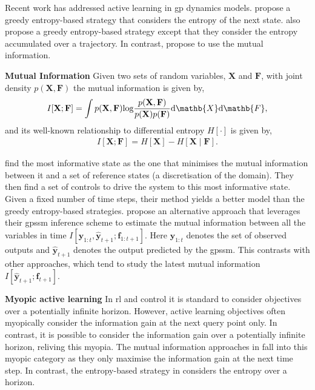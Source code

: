 \documentclass{mimosis-class/mimosis}
\numberwithin{equation}{chapter}
\begin{document}
Recent work has addressed active learning in \acrshort{gp} dynamics models. \cite{schreiterSafe2015}
propose a greedy entropy-based strategy that considers the entropy of the
next state. \cite{buisson-fenetActively2020} also propose a greedy entropy-based strategy
except that they consider the entropy accumulated over a trajectory. In contrast,
\cite{caponeLocalized2020,yuActive2021} propose to use the mutual information.
\begin{myquote}
\textbf{Mutual Information}
Given two sets of random variables, $\mathbf{X}$ and $\mathbf{F}$, with joint density $p(\mathbf{X}, \mathbf{F})$ the
mutual information \citep{coverElements2006} is given by,
\begin{align} \label{eq-mutual-information}
I[\mathbf{X};\mathbf{F}] = \int p(\mathbf{X},\mathbf{F}) \text{log}\frac{p(\mathbf{X},\mathbf{F})}{p(\mathbf{X})p(\mathbf{F})}
\text{d}\mathb{X} \text{d}\mathb{F},
\end{align}
and its well-known relationship to differential entropy $H[\cdot]$ is given by,
\begin{align} \label{eq-mutual-information-entropy}
I[\mathbf{X};\mathbf{F}] =  H[\mathbf{X}] - H[\mathbf{X} \mid \mathbf{F}].
\end{align}
\end{myquote}
\cite{caponeLocalized2020} find the most informative state as the one that minimises the
mutual information between it and a set of reference states (a discretisation of the
domain). They then find a set of controls to drive the system to this most informative state.
Given a fixed number of time steps, their method yields a better model
than the greedy entropy-based strategies.
\cite{yuActive2021}  propose an alternative
approach that leverages their \acrfull{gpssm} inference scheme to estimate the mutual
information between all the variables in time
\(I \left[\mathbf{y}_{1:t}, \hat{\mathbf{y}}_{t+1} ; \mathbf{f}_{1:t+1} \right]\).
Here \(\mathbf{y}_{1:t}\) denotes the set of observed outputs and \(\hat{\mathbf{y}}_{t+1}\) denotes
the output predicted by the \acrshort{gpssm}. This contrasts with other approaches, which tend
to study the latest mutual information \(I[\hat{\mathbf{y}}_{t+1} ; \mathbf{f}_{t+1}]\).

\textbf{Myopic active learning}
In \acrshort{rl} and control it is standard to consider objectives over a potentially infinite horizon.
However, active learning objectives often myopically consider the information gain at the next query point only.
In contrast, it is possible to consider the information gain over a potentially infinite horizon, reliving this myopia.
The mutual information approaches in \cite{caponeLocalized2020,yuActive2021}
fall into this myopic category as they only maximise the information gain at the next
time step. In contrast, the entropy-based strategy in
\cite{buisson-fenetActively2020} considers the entropy over a horizon.
\end{document}
